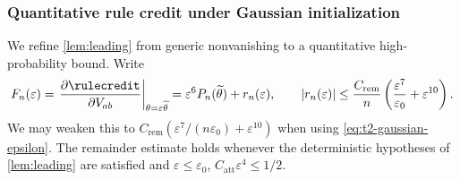 
\subsubsection*{Quantitative rule credit under Gaussian initialization}
\label{app:t2-gaussian}

We refine \cref{lem:leading} from generic nonvanishing to a quantitative
high-probability bound.  Write
\begin{equation}
 F_n(\varepsilon)=
 \left.\frac{\partial\rulecredit}{\partial V_{ab}}
 \right|_{\theta=\varepsilon\widetilde\theta}
 =\varepsilon^6P_n(\widetilde\theta)+r_n(\varepsilon),
 \qquad
 |r_n(\varepsilon)|\le\frac{C_{\mathrm{rem}}}{n}
 \left(\frac{\varepsilon^7}{\varepsilon_0}+\varepsilon^{10}\right).
 \label{eq:quant-rule-expansion}
\end{equation}
We may weaken this to $C_{\mathrm{rem}}(\varepsilon^7/(n\varepsilon_0)+\varepsilon^{10})$
when using \cref{eq:t2-gaussian-epsilon}. The remainder estimate holds whenever the deterministic hypotheses of
\cref{lem:leading} are satisfied and
$\varepsilon\le\varepsilon_0$,
$C_{\mathrm{att}}\varepsilon^4\le1/2$.

